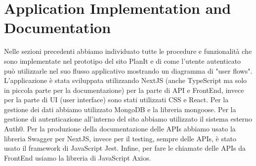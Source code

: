 \section{Application Implementation and Documentation}
\label{secD4:ApplicationImplementationAndDocumentation}
Nelle sezioni precedenti abbiamo individuato tutte le procedure e funzionalità che sono implementate nel prototipo del sito PlanIt e di come l'utente autenticato può utilizzarle nel suo flusso applicativo mostrando un diagramma di "user flows". L'applicazione è stata sviluppata utilizzando NextJS (anche TypeScript ma solo in piccola parte per la documentazione) per la parte di API e FrontEnd, invece per la parte di UI (user interface) sono stati utilizzati CSS e React. Per la gestione dei dati abbiamo utilizzato MongoDB e la libreria mongoose. Per la gestione di autenticazione all'interno del sito abbiamo utilizzato il sistema esterno Auth0. Per la produzione della documentazione delle APIs abbiamo usato la libreria Swagger per NextJS, invece per il testing, sempre delle APIs, è stato usato il framework di JavaScript Jest. Infine, per fare le chiamate delle APIs da FrontEnd usiamo la libreria di JavaScript Axios.
